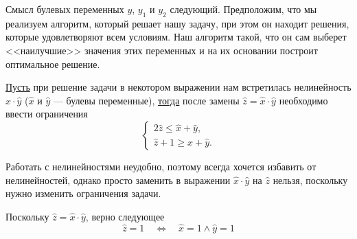 \remark

Смысл булевых переменных $y$, $y_1$ и $y_2$ следующий.  Предположим, что мы реализуем алгоритм, который решает нашу задачу, при этом он находит решения, которые удовлетворяют всем условиям. Наш алгоритм  такой, что он сам выберет <<наилучшие>> значения этих переменных и на их основании построит оптимальное решение.

\label{fact:substituion_of_nonlinear}

\underline{Пусть} при решение задачи в некотором выражении нам встретилась нелинейность $\hat{x} \cdot \hat{y}$ ($\hat{x}$ и $\hat{y}$ --- булевы переменные), \underline{тогда} после замены $\hat{z} = \hat{x} \cdot \hat{y}$ необходимо ввести ограничения
\[
\begin{cases}
	2\hat{z} \le \hat{x} + \hat{y}, \\
	\hat{z} + 1 \ge \hat{x} + \hat{y}.
\end{cases}
\]

\begin{note}
	Работать с нелинейностями неудобно, поэтому всегда хочется избавить от нелинейностей, однако просто заменить в выражении $\hat{x} \cdot \hat{y}$ на $\hat{z}$ нельзя, поскольку нужно изменить ограничения задачи. 
\end{note}

\prooof

Поскольку $\hat{z} = \hat{x} \cdot \hat{y}$, верно следующее
\[
\hat{z} = 1 \quad \Longleftrightarrow \quad \hat{x} = 1 \land \hat{y} = 1
\]

